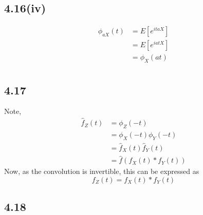 \documentclass[letterpaper,12pt]{article}
\theoremstyle{definition}
\begin{document}
\subsection*{4.16(iv)}
\begin{align*}
    \phi_{aX}(t) &= E[e^{itaX}] \\
    &= E[e^{iatX}] \\
    &= \phi_{X}(at) \\
\end{align*}


\subsection*{4.17}
Note, 
\begin{align*}
    \hat f _Z(t) &= \phi_Z(-t)\\
    & =  \phi_X(-t)\phi_Y(-t) \\
    & = \hat f_X(t) \hat f_Y(t)\\
    & =  \hat f (f_X(t) * f_Y(t))
\end{align*}
Now, as the convolution is invertible, this can be expressed as
\[f_Z(t) = f_X(t) * f_Y(t)\]
\subsection*{4.18}
\end{document}
